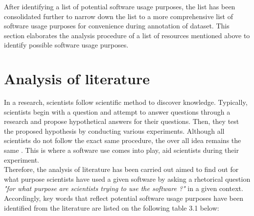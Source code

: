 After identifying a list of potential software usage purposes, the list has been consolidated further to narrow down the list to a more comprehensive list of software usage purposes for convenience during annotation of dataset. This section elaborates the analysis procedure of a list of resources mentioned above to identify possible software usage purposes. \\
 

\section{Analysis of literature }
\label{sec:purpose:literatures}

In a research, scientists follow scientific method to discover knowledge. Typically, scientists begin with a question and attempt to answer questions through a research and propose hypothetical answers for their questions. Then, they test the proposed hypothesis by conducting various experiments. Although all scientists do not follow the exact same procedure, the over all idea remains the same \citep{enwiki:1061107378}. This is where a software use comes into play, aid scientists during their experiment. \\

Therefore, the analysis of literature has been carried out aimed to find out for what purpose scientists have used a given software by asking a rhetorical question \emph{ "for what purpose are scientists trying to use the software ?"} in a given context. \\

Accordingly, key words that reflect potential software usage purposes have been identified from the literature are listed on the following table 3.1 below: \\

